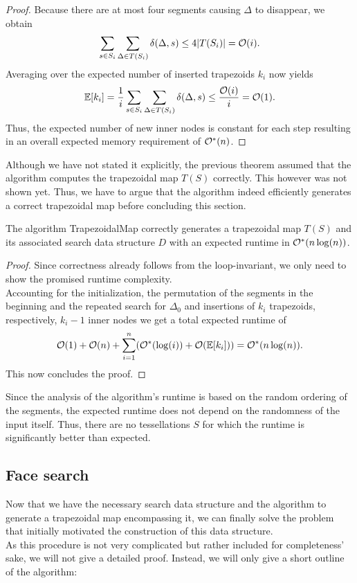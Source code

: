 \begin{proof}
            Because there are at most four segments causing $\Delta$ to disappear, we obtain
            $$\sum_{s \in S_i} \sum_{\Delta \in T(S_i)} \delta(\Delta, s) \leq 4\vert T(S_i) \vert = \mathcal{O}(i) .$$ 
            Averaging over the expected number of inserted trapezoids $k_i$ now yields
            $$\mathbb{E}[k_i] = \frac{1}{i} \sum_{s \in S_i} \sum_{\Delta \in T(S_i)} \delta(\Delta, s) \leq \frac{\mathcal{O}(i)}{i} = \mathcal{O}(1) .$$
            Thus, the expected number of new inner nodes is constant for each step resulting in an overall expected memory requirement of $\mathcal{O}^\ast(n)$.
        \end{proof}

        Although we have not stated it explicitly, the previous theorem assumed that the algorithm computes the trapezoidal map $T(S)$ correctly. This however was not shown yet. Thus, we have to argue that the algorithm indeed efficiently generates a correct trapezoidal map before concluding this section.

        \begin{proposition}
            The algorithm TrapezoidalMap correctly generates a trapezoidal map $T(S)$ and its associated search data structure $D$ with an expected runtime in $\mathcal{O}^\ast(n\log(n))$.
        \end{proposition}
        \begin{proof}
            Since correctness already follows from the loop-invariant, we only need to show the promised runtime complexity. \\
            Accounting for the initialization, the permutation of the segments in the beginning and the repeated search for $\Delta_0$ and insertions of $k_i$ trapezoids, respectively, $k_i - 1$ inner nodes we get a total expected runtime of
            $$\mathcal{O}(1) + \mathcal{O}(n) + \sum_{i=1}^n (\mathcal{O}^\ast(\log(i)) + \mathcal{O}(\mathbb{E}[k_i])) = \mathcal{O}^\ast(n\log(n)) .$$
            This now concludes the proof.
        \end{proof}

        \begin{remark}
            Since the analysis of the algorithm's runtime is based on the random ordering of the segments, the expected runtime does not depend on the randomness of the input itself. Thus, there are no tessellations $S$ for which the runtime is significantly better than expected.
        \end{remark}

    \subsection{Face search}
        Now that we have the necessary search data structure and the algorithm to generate a trapezoidal map encompassing it, we can finally solve the problem that initially motivated the construction of this data structure. \\
        As this procedure is not very complicated but rather included for completeness' sake, we will not give a detailed proof. Instead, we will only give a short outline of the algorithm: \\


